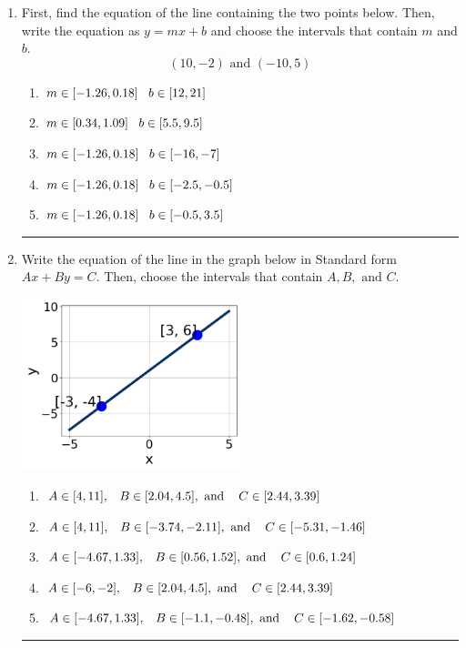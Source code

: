 \documentclass[14pt]{extbook}
\newcommand{\litem}[1]{\item#1\hspace*{-1cm}\rule{\textwidth}{0.4pt}}
\begin{document}
\begin{enumerate}
{\begin{enumerate}[label=\Alph*.]
\end{enumerate} }
\litem{
First, find the equation of the line containing the two points below. Then, write the equation as $ y=mx+b $ and choose the intervals that contain $m$ and $b$.\[ (10, -2) \text{ and } (-10, 5) \]\begin{enumerate}[label=\Alph*.]
\item \( m \in [-1.26, 0.18] \hspace*{3mm} b \in [12, 21] \)
\item \( m \in [0.34, 1.09] \hspace*{3mm} b \in [5.5, 9.5] \)
\item \( m \in [-1.26, 0.18] \hspace*{3mm} b \in [-16, -7] \)
\item \( m \in [-1.26, 0.18] \hspace*{3mm} b \in [-2.5, -0.5] \)
\item \( m \in [-1.26, 0.18] \hspace*{3mm} b \in [-0.5, 3.5] \)

\end{enumerate} }
\litem{
Write the equation of the line in the graph below in Standard form $Ax+By=C$. Then, choose the intervals that contain $A, B, \text{ and } C$.
\begin{center}
    \includegraphics[width=0.5\textwidth]{../Figures/linearGraphToStandardA.png}
\end{center}
\begin{enumerate}[label=\Alph*.]
\item \( A \in [4, 11], \hspace{3mm} B \in [2.04, 4.5], \text{ and } \hspace{3mm} C \in [2.44, 3.39] \)
\item \( A \in [4, 11], \hspace{3mm} B \in [-3.74, -2.11], \text{ and } \hspace{3mm} C \in [-5.31, -1.46] \)
\item \( A \in [-4.67, 1.33], \hspace{3mm} B \in [0.56, 1.52], \text{ and } \hspace{3mm} C \in [0.6, 1.24] \)
\item \( A \in [-6, -2], \hspace{3mm} B \in [2.04, 4.5], \text{ and } \hspace{3mm} C \in [2.44, 3.39] \)
\item \( A \in [-4.67, 1.33], \hspace{3mm} B \in [-1.1, -0.48], \text{ and } \hspace{3mm} C \in [-1.62, -0.58] \)


\end{enumerate}}
\end{enumerate}
\end{document}

